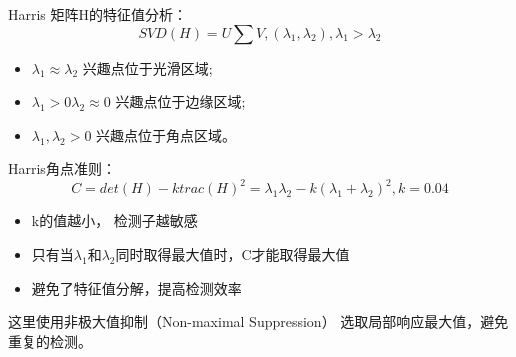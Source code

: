 Harris 矩阵H的特征值分析：
\begin{equation*}
	SVD(H) = U \sum V, (\lambda_1, \lambda_2), \lambda_1 > \lambda_2
\end{equation*}
\begin{itemize}[leftmargin=2cm]
	\item $\lambda_1 \approx \lambda_2$ 兴趣点位于光滑区域;
	\item $\lambda_1 > 0  \lambda_2 \approx 0$ 兴趣点位于边缘区域;
	\item $\lambda_1, \lambda_2 > 0$ 兴趣点位于角点区域。
\end{itemize}

Harris角点准则：
\begin{equation*}
	C = det(H) - ktrac(H)^2 = \lambda_1\lambda_2 - k(\lambda_1 + \lambda_2)^2, k = 0.04
\end{equation*}
\begin{itemize}[leftmargin=2cm]
	\item k的值越小， 检测子越敏感
	\item 只有当$\lambda_1$和$\lambda_2$同时取得最大值时，C才能取得最大值
	\item 避免了特征值分解，提高检测效率
\end{itemize}
这里使用非极大值抑制（Non-maximal Suppression）
选取局部响应最大值，避免重复的检测。